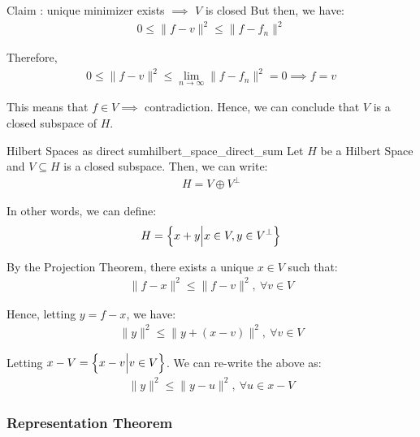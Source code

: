 \begin{proof*}
\begin{subproof}{\newline Claim : unique minimizer exists $\implies$ $V$ is closed}
        \noindent But then, we have:
        \begin{align*}
            0 \le \|f - v\|^2 \le \|f - f_n\|^2
        \end{align*}

        \noindent Therefore,
        \begin{align*}
            0 \le \|f - v\|^2 \le \lim_{n\to\infty} \|f - f_n\|^2 = 0 \implies f = v
        \end{align*}

        \noindent This means that $f \in V \implies$ contradiction. Hence, we can conclude that $V$ is a closed subspace of $H$.
    \end{subproof}
\end{proof*}

\begin{corollary}{Hilbert Spaces as direct sum}{hilbert_space_direct_sum}
    Let $H$ be a Hilbert Space and $V\subseteq H$ is a closed subspace. Then, we can write:
    \begin{align*}
        H = V \oplus V^\perp
    \end{align*}

    \noindent In other words, we can define:
    \begin{align*}
        H = \Big\{ 
            x + y \Big| x\in V, y \in V^\perp 
         \Big\}
    \end{align*}
\end{corollary}

\begin{proof*}
    By the Projection Theorem, there exists a unique $x\in V$ such that:
    \begin{align*}
        \|f - x \|^2 \le \|f - v\|^2, \ \forall v \in V
    \end{align*}

    \noindent Hence, letting $y = f - x$, we have:
    \begin{align*}
        \|y\|^2 \le \|y + (x - v)\|^2, \ \forall v \in V
    \end{align*}

    \noindent Letting $x - V = \Big\{ x - v \Big| v \in V \Big\}$. We can re-write the above as:
    \begin{align*}
        \|y\|^2 \le \|y - u\|^2, \ \forall u \in x - V
    \end{align*}
\end{proof*}


\subsubsection{Representation Theorem}
